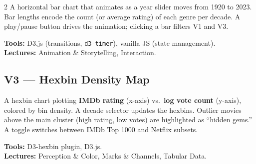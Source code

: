 \documentclass[a4paper,10pt]{article}
\begin{document}
\begin{multicols}{2}
A horizontal bar chart that animates as a year slider moves from 1920 to 2023.
Bar lengths encode the count (or average rating) of each genre per decade.
A play/pause button drives the animation; clicking a bar filters V1 and V3.

\textbf{Tools:} D3.js (transitions, \texttt{d3-timer}), vanilla JS (state management).\\
\textbf{Lectures:} Animation \& Storytelling, Interaction.

\subsection*{V3 — Hexbin Density Map}

\begin{center}
\end{center}

A hexbin chart plotting \textbf{IMDb rating} (x-axis) vs.\ \textbf{log vote
count} (y-axis), colored by bin density. A decade selector updates the hexbins.
Outlier movies above the main cluster (high rating, low votes) are highlighted as
``hidden gems.'' A toggle switches between IMDb Top 1000 and Netflix subsets.

\textbf{Tools:} D3-hexbin plugin, D3.js.\\
\textbf{Lectures:} Perception \& Color, Marks \& Channels, Tabular Data.

\end{multicols}

\end{document}
